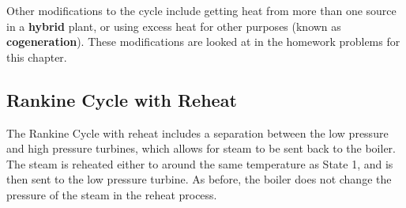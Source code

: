 Other modifications to the cycle include getting heat from more than one source in a {\bf hybrid} plant, or using excess heat for other purposes (known as {\bf cogeneration}).  These modifications are looked at in the homework problems for this chapter.

\subsection{Rankine Cycle with Reheat} \label{sec:ch4_reheat}
The Rankine Cycle with reheat includes a separation between the low pressure and high pressure turbines, which allows for steam to be sent back to the boiler.  The steam is reheated either to around the same temperature as State 1, and is then sent to the low pressure turbine.  As before, the boiler does not change the pressure of the steam in the reheat process.

